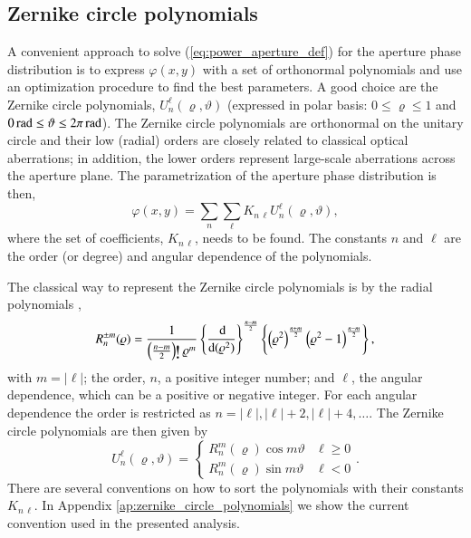 \documentclass[
    ]
    {aa}
\begin{document}
    \subsection{Zernike circle polynomials}
    \label{sec:zernike_circle_poly}

    A convenient approach to solve (\ref{eq:power_aperture_def}) for the aperture phase distribution is to express $\varphi(x, y)$ with a set of orthonormal polynomials and use an optimization procedure to find the best parameters. A good choice are the Zernike circle polynomials, $U^\ell_n(\varrho,\vartheta)$ (expressed in polar basis: $0\leq\varrho\leq1$ and $\SI{0}{\radian}\leq\vartheta\leq\SI[parse-numbers=false]{2\pi}{\radian}$). The Zernike circle polynomials are orthonormal on the unitary circle and their low (radial) orders are closely related to classical optical aberrations; in addition, the lower orders represent large-scale aberrations across the aperture plane.
    The parametrization of the aperture phase distribution is then,
    \begin{equation}
        \varphi(x, y) = \sum_n \sum_\ell K_{n\,\ell} U^\ell_n(\varrho,\vartheta),
        \label{eq:aperture_phase_distribution}
    \end{equation}
    where the set of coefficients, $K_{n\,\ell}$, needs to be found. The constants $n$ and $\ell$ are the order (or degree) and angular dependence of the polynomials.

    The classical way to represent the Zernike circle polynomials is by the radial polynomials \citep{1965poet.book.....B},
    \begin{equation}
        R^{\pm m}_n(\varrho)  = \frac{1}{\intoo{\frac{n-m}{2}} \hspace{-3pt}  \raisebox{-.7ex}{\scalebox{1.5}{!}} \, \varrho^m} \cbr{\frac{\dif}{\dif \,(\varrho^2)}}^{\frac{n-m}{2}}\cbr{\intoo{\varrho^2}^{\frac{n+m}{2}}\intoo{\varrho^2-1}^{\frac{n-m}{2}}},
        \label{eqd:radial}
    \end{equation}
    with $m=|\ell|$; the order, $n$, a positive integer number; and $\ell$, the angular dependence, which can be a positive or negative integer. For each angular dependence the order is restricted as $n=|\ell|, |\ell| + 2, |\ell|+ 4, \dotso$. The Zernike circle polynomials are then given by
    \begin{equation}
        U ^{\ell}_n(\varrho,\vartheta)  =  \begin{cases} R^m_n(\varrho)\cos m\vartheta & \ell \geqslant0 \\ R^m_n(\varrho)\sin m\vartheta & \ell<0 \end{cases}.
        \label{eq:zernike}
    \end{equation}
    There are several conventions on how to sort the polynomials with their constants $K_{n\,\ell}$. In Appendix \ref{ap:zernike_circle_polynomials} we show the current convention used in the presented analysis.
\end{document}

